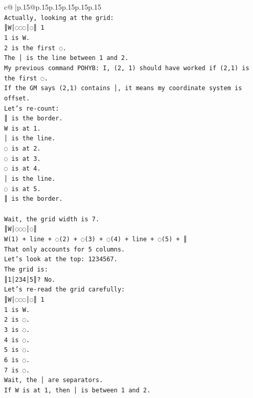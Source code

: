 \documentclass{article}
\begin{document}
{\begin{supertabular}{c@{$\;$}|p{.15\linewidth}@{}p{.15\linewidth}p{.15\linewidth}p{.15\linewidth}p{.15\linewidth}p{.15\linewidth}}
{{{\\ 
\texttt{Actually, looking at the grid:} \\
\texttt{║W│◌◌◌│◌║ 1} \\
\texttt{1 is W.} \\
\texttt{2 is the first ◌.} \\
\texttt{The │ is the line between 1 and 2.} \\
\texttt{My previous command POHYB: I, (2, 1) should have worked if (2,1) is the first ◌.} \\
\texttt{If the GM says (2,1) contains │, it means my coordinate system is offset.} \\
\texttt{Let's re{-}count:} \\
\texttt{║ is the border.} \\
\texttt{W is at 1.} \\
\texttt{│ is the line.} \\
\texttt{◌ is at 2.} \\
\texttt{◌ is at 3.} \\
\texttt{◌ is at 4.} \\
\texttt{│ is the line.} \\
\texttt{◌ is at 5.} \\
\texttt{║ is the border.} \\
\\ 
\texttt{Wait, the grid width is 7.} \\
\texttt{║W│◌◌◌│◌║} \\
\texttt{W(1) + line + ◌(2) + ◌(3) + ◌(4) + line + ◌(5) + ║} \\
\texttt{That only accounts for 5 columns.} \\
\texttt{Let's look at the top: 1234567.} \\
\texttt{The grid is:} \\
\texttt{║1│234│5║? No.} \\
\texttt{Let's re{-}read the grid carefully:} \\
\texttt{║W│◌◌◌│◌║ 1} \\
\texttt{1 is W.} \\
\texttt{2 is ◌.} \\
\texttt{3 is ◌.} \\
\texttt{4 is ◌.} \\
\texttt{5 is ◌.} \\
\texttt{6 is ◌.} \\
\texttt{7 is ◌.} \\
\texttt{Wait, the │ are separators.} \\
\texttt{If W is at 1, then │ is between 1 and 2.} \\
}}}
\end{supertabular}}
\end{document}
